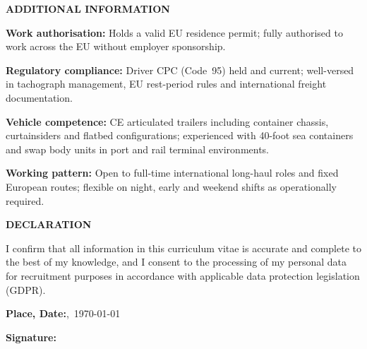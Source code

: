 \documentclass[10pt,a4paper]{article}
\newcommand{\rh}[1]{%
  \vspace{9pt}%
  {\color{navy}\fontsize{7.5}{10}\selectfont\bfseries\MakeUppercase{#1}}\par
  \vspace{2pt}{\color{rulec}\hrule height 0.4pt}\par
  \vspace{6pt}%
}
\begin{document}
\begin{minipage}[t][297mm][t]{0.682\textwidth}
\begin{minipage}[t]{\textwidth-20pt}
\rh{Additional Information}

\begin{cvlist}
\item \textbf{Work authorisation:} Holds a valid EU residence
  permit; fully authorised to work across the EU without
  employer sponsorship.
\item \textbf{Regulatory compliance:} Driver CPC (Code~95) held
  and current; well-versed in tachograph management, EU
  rest-period rules and international freight documentation.
\item \textbf{Vehicle competence:} CE articulated trailers
  including container chassis, curtainsiders and flatbed
  configurations; experienced with 40-foot sea containers and
  swap body units in port and rail terminal environments.
\item \textbf{Working pattern:} Open to full-time international
  long-haul roles and fixed European routes; flexible on night,
  early and weekend shifts as operationally required.
\end{cvlist}

\rh{Declaration}

{\fontsize{7.8}{11}\selectfont\color{body}
I confirm that all information in this curriculum vitae is
accurate and complete to the best of my knowledge, and I consent
to the processing of my personal data for recruitment purposes
in accordance with applicable data protection legislation
(GDPR).\par
}

\vspace{14pt}

{\fontsize{7.8}{11}\selectfont\color{body}
\textbf{Place, Date:}\quad [City],\ \today\par
}

\vspace{14pt}

{\fontsize{7.8}{11}\selectfont\color{body}
\textbf{Signature:}\quad\underline{\hspace{5.5cm}}\par
}

\end{minipage}
\end{minipage}
\end{document}
